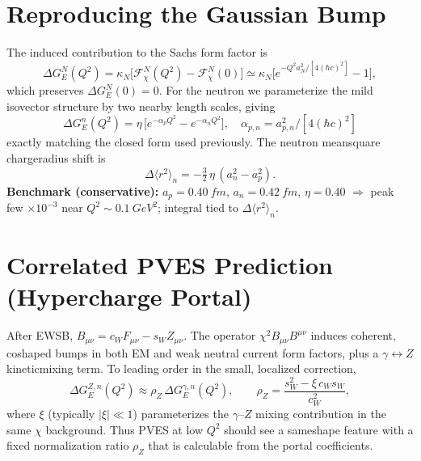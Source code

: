 \documentclass[11pt]{article}
\newcommand{\hc}{\hbar c}
\newcommand{\GE}{G_E}
\newcommand{\GN}{G_E^n}
\begin{document}
\section{Reproducing the Gaussian Bump}
The induced contribution to the Sachs form factor is
\begin{equation}
\Delta \GE^N(Q^2)=\kappa_N\Big[\mathcal F_\chi^N(Q^2)-\mathcal F_\chi^N(0)\Big]\simeq \kappa_N\Big[e^{-Q^2 a_N^2/[4(\hc)^2]}-1\Big],
\end{equation}
which preserves $\Delta \GE^N(0)=0$. For the neutron we parameterize the mild isovector structure by two nearby length scales, giving
\begin{equation}
\boxed{\;\Delta \GN(Q^2)=\eta\,\Big[e^{-\alpha_p Q^2}-e^{-\alpha_n Q^2}\Big],\quad \alpha_{p,n}=a_{p,n}^2/[4(\hc)^2] \;} 
\end{equation}
exactly matching the closed form used previously. The neutron mean\mbox{\textendash}square charge\mbox{\textendash}radius shift is
\begin{equation}
\Delta\langle r^2\rangle_n=-\tfrac{3}{2}\,\eta\,(a_n^2-a_p^2).
\end{equation}
\noindent\textbf{Benchmark (conservative):} $a_p=\SI{0.40}{fm}$, $a_n=\SI{0.42}{fm}$, $\eta=0.40$ $\Rightarrow$ peak few $\times 10^{-3}$ near $Q^2\sim\SI{0.1}{GeV^2}$; integral tied to $\Delta\langle r^2\rangle_n$.


\section{Correlated PVES Prediction (Hypercharge Portal)}
After EWSB, $B_{\mu\nu}=c_W F_{\mu\nu}-s_W Z_{\mu\nu}$. The operator $\chi^2 B_{\mu\nu}B^{\mu\nu}$ induces coherent, co\mbox{\textendash}shaped bumps in both EM and weak neutral current form factors, plus a $\gamma\leftrightarrow Z$ kinetic\mbox{\textendash}mixing term. To leading order in the small, localized correction,
\begin{equation}
\Delta \GE^{Z,n}(Q^2)\approx \rho_Z\,\Delta \GE^{\gamma,n}(Q^2),\qquad \rho_Z=\frac{s_W^2-\xi\,c_W s_W}{c_W^2},
\end{equation}
where $\xi$ (typically $|\xi|\ll1$) parameterizes the $\gamma$--$Z$ mixing contribution in the same $\chi$ background. Thus PVES at low $Q^2$ should see a same\mbox{\textendash}shape feature with a fixed normalization ratio $\rho_Z$ that is calculable from the portal coefficients.
\end{document}
